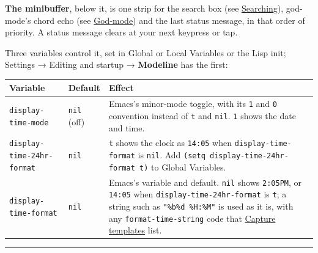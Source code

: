 \documentclass[11pt]{article}
\begin{document}
\textbf{The minibuffer}, below it, is one strip for the search box (see \hyperref[sec:org22ae446]{Searching}), god-mode's chord echo (see \hyperref[sec:orgc091c26]{God-mode}) and the last status message, in that order of priority. A status message clears at your next keypress or tap.

Three variables control it, set in Global or Local Variables or the Lisp init; Settings → Editing and startup → \textbf{Modeline} has the first:

\begin{center}
\begin{tabular}{lll}
Variable & Default & Effect\\[0pt]
\hline
\texttt{display-time-mode} & \texttt{nil} (off) & Emacs's minor-mode toggle, with its \texttt{1} and \texttt{0} convention instead of \texttt{t} and \texttt{nil}. \texttt{1} shows the date and time.\\[0pt]
\texttt{display-time-24hr-format} & \texttt{nil} & \texttt{t} shows the clock as \texttt{14:05} when \texttt{display-time-format} is \texttt{nil}. Add \texttt{(setq display-time-24hr-format t)} to Global Variables.\\[0pt]
\texttt{display-time-format} & \texttt{nil} & Emacs's variable and default. \texttt{nil} shows \texttt{2:05PM}, or \texttt{14:05} when \texttt{display-time-24hr-format} is \texttt{t}; a string such as \texttt{"\%b\%d \%H:\%M"} is used as it is, with any \texttt{format-time-string} code that \hyperref[sec:org0116725]{Capture templates} list.\\[0pt]
\end{tabular}
\end{center}

\noindent\rule{\textwidth}{0.5pt}
\end{document}
